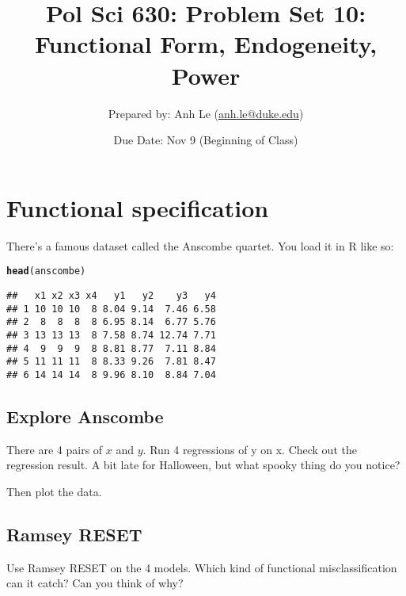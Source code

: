 \documentclass{article}\usepackage[]{graphicx}\usepackage[]{color}
\makeatletter
\newcommand{\hlstd}[1]{\textcolor[rgb]{0.345,0.345,0.345}{#1}}%
\newcommand{\hlkwd}[1]{\textcolor[rgb]{0.737,0.353,0.396}{\textbf{#1}}}%
\newenvironment{kframe}{%
 \def\at@end@of@kframe{}%
 \ifinner\ifhmode%
  \def\at@end@of@kframe{\end{minipage}}%
  \begin{minipage}{\columnwidth}%
 \fi\fi%
 \def\FrameCommand##1{\hskip\@totalleftmargin \hskip-\fboxsep
 \colorbox{shadecolor}{##1}\hskip-\fboxsep
     \hskip-\linewidth \hskip-\@totalleftmargin \hskip\columnwidth}%
 \MakeFramed {\advance\hsize-\width
   \@totalleftmargin\z@ \linewidth\hsize
   \@setminipage}}%
 {\par\unskip\endMakeFramed%
 \at@end@of@kframe}
\newenvironment{knitrout}{}{} %
\makeatother
\begin{document}
\title{Pol Sci 630:  Problem Set 10: Functional Form, Endogeneity, Power}

\author{Prepared by: Anh Le (\href{mailto:anh.le@duke.edu}{anh.le@duke.edu})}

\date{Due Date: Nov 9 (Beginning of Class)}

\maketitle

\section{Functional specification}

There's a famous dataset called the Anscombe quartet. You load it in R like so:

\begin{knitrout}
\color{fgcolor}\begin{kframe}
\begin{alltt}
\hlkwd{head}\hlstd{(anscombe)}
\end{alltt}
\begin{verbatim}
##   x1 x2 x3 x4   y1   y2    y3   y4
## 1 10 10 10  8 8.04 9.14  7.46 6.58
## 2  8  8  8  8 6.95 8.14  6.77 5.76
## 3 13 13 13  8 7.58 8.74 12.74 7.71
## 4  9  9  9  8 8.81 8.77  7.11 8.84
## 5 11 11 11  8 8.33 9.26  7.81 8.47
## 6 14 14 14  8 9.96 8.10  8.84 7.04
\end{verbatim}
\end{kframe}
\end{knitrout}

\subsection{Explore Anscombe}

There are 4 pairs of $x$ and $y$. Run 4 regressions of y on x. Check out the regression result. A bit late for Halloween, but what spooky thing do you notice?

Then plot the data.

\subsection{Ramsey RESET}

Use Ramsey RESET on the 4 models. Which kind of functional misclassification can it catch? Can you think of why?
\end{document}
